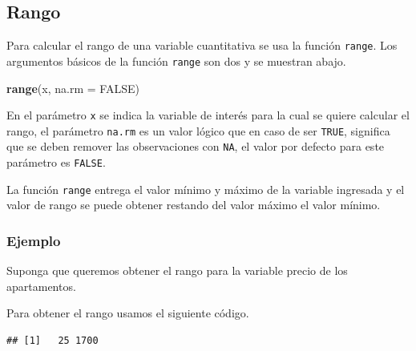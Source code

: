 \documentclass[10pt,]{krantz}
\makeatletter
\newenvironment{Shaded}{\begin{snugshade}}{\end{snugshade}}
\newcommand{\KeywordTok}[1]{\textcolor[rgb]{0.13,0.29,0.53}{\textbf{#1}}}
\newcommand{\DataTypeTok}[1]{\textcolor[rgb]{0.13,0.29,0.53}{#1}}
\newcommand{\StringTok}[1]{\textcolor[rgb]{0.31,0.60,0.02}{#1}}
\newcommand{\OtherTok}[1]{\textcolor[rgb]{0.56,0.35,0.01}{#1}}
\newcommand{\OperatorTok}[1]{\textcolor[rgb]{0.81,0.36,0.00}{\textbf{#1}}}
\newcommand{\NormalTok}[1]{#1}
\newenvironment{kframe}{%
\medskip{}
\setlength{\fboxsep}{.8em}
 \def\at@end@of@kframe{}%
 \ifinner\ifhmode%
  \def\at@end@of@kframe{\end{minipage}}%
  \begin{minipage}{\columnwidth}%
 \fi\fi%
 \def\FrameCommand##1{\hskip\@totalleftmargin \hskip-\fboxsep
 \colorbox{shadecolor}{##1}\hskip-\fboxsep
     \hskip-\linewidth \hskip-\@totalleftmargin \hskip\columnwidth}%
 \MakeFramed {\advance\hsize-\width
   \@totalleftmargin\z@ \linewidth\hsize
   \@setminipage}}%
 {\par\unskip\endMakeFramed%
 \at@end@of@kframe}
\renewenvironment{Shaded}{\begin{kframe}}{\end{kframe}}
\makeatother
\begin{document}
\subsection{\texorpdfstring{Rango 
}{Rango  }}\label{rango}

Para calcular el rango de una variable cuantitativa se usa la función
\texttt{range}. Los argumentos básicos de la función \texttt{range} son
dos y se muestran abajo.

\begin{Shaded}
\begin{Highlighting}[]
\KeywordTok{range}\NormalTok{(x, }\DataTypeTok{na.rm =} \OtherTok{FALSE}\NormalTok{)}
\end{Highlighting}
\end{Shaded}

En el parámetro \texttt{x} se indica la variable de interés para la cual
se quiere calcular el rango, el parámetro \texttt{na.rm} es un valor
lógico que en caso de ser \texttt{TRUE}, significa que se deben remover
las observaciones con \texttt{NA}, el valor por defecto para este
parámetro es \texttt{FALSE}.

La función \texttt{range} entrega el valor mínimo y máximo de la
variable ingresada y el valor de rango se puede obtener restando del
valor máximo el valor mínimo.

\subsubsection*{Ejemplo}\label{ejemplo-20}

Suponga que queremos obtener el rango para la variable precio de los
apartamentos.

Para obtener el rango usamos el siguiente código.

\begin{Shaded}
\end{Shaded}

\begin{verbatim}
## [1]   25 1700
\end{verbatim}

\begin{Shaded}
\end{Shaded}
\end{document}
